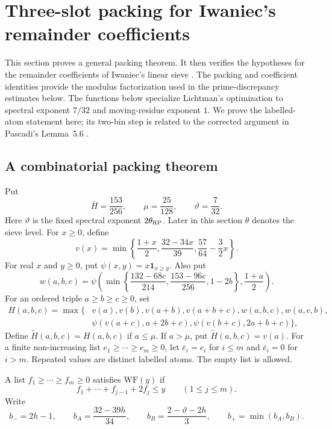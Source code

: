 \section{Three-slot packing for Iwaniec's remainder coefficients}\label{sec:pack}

This section proves a general packing theorem. It then verifies the
hypotheses for the remainder coefficients of Iwaniec's linear sieve
\cite[Theorem~4]{AA37}. The packing and coefficient identities provide
the modulus factorization used in the prime-discrepancy estimates below.
The functions below specialize Lichtman's optimization
\cite[Proposition~6.1, (6.2), (6.4)]{Lichtman23} to spectral exponent
$7/32$ and moving-residue exponent $1$. We prove the labelled-atom
statement here; its two-bin step is related to the corrected argument
in Pascadi's Lemma~5.6 \cite{Pascadi25}.

\subsection{A combinatorial packing theorem}

Put
\[
 \overline H=\frac{153}{256},\qquad \mu=\frac{25}{128},
 \qquad \vartheta=\frac7{32}.
\]
Here $\vartheta$ is the fixed spectral exponent $2\theta_{\rm RP}$.
Later in this section $\theta$ denotes the sieve level.
For $x\ge0$, define
\[
 v(x)=\min\left\{\frac{1+x}{2},\frac{32-34x}{39},
                         \frac{57}{64}-\frac32x\right\}.
\]
For real $x$ and $y\ge0$, put $\psi(x,y)=x\mathbf 1_{x\ge y}$.
Also put
\[
 w(a,b,c)=\psi\left(\min\left\{
       \frac{132-68c}{214},\frac{153-96c}{256},1-2b\right\},
       \frac{1+a}{2}\right).
\]
For an ordered triple $a\ge b\ge c\ge0$, set
\[
\begin{split}
 H(a,b,c)=\max\{&v(a),v(b),v(a+b),v(a+b+c),w(a,b,c),w(a,c,b),\\
                 &\psi(v(a+c),a+2b+c),
                   \psi(v(b+c),2a+b+c)\},
\end{split}
\]
Define $\widetilde H(a,b,c)=H(a,b,c)$ if $a\le\mu$.
If $a>\mu$, put $\widetilde H(a,b,c)=v(a)$. For a finite non-increasing
list $e_1\ge\cdots\ge e_m\ge0$, let $\bar e_i=e_i$ for $i\le m$
and $\bar e_i=0$ for $i>m$. Repeated values are distinct labelled
atoms. The empty list is allowed.

A list $f_1\ge\cdots\ge f_m\ge0$ satisfies $\mathrm{WF}(y)$ if
\[
 f_1+\cdots+f_{j-1}+2f_j\le y\qquad(1\le j\le m).
 \tag{4.1}\label{eq:pack-wf}
\]
Write
\[
 b_-=2h-1,\qquad b_A=\frac{32-39h}{34},\qquad
 b_B=\frac{2-\vartheta-2h}{3},\qquad b_+=\min(b_A,b_B).
\]

